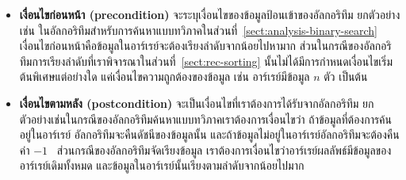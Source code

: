 \begin{itemize}
\item {\bf เงื่อนไข{\wbr}ก่อนหน้า (precondition)}
  จะ{\wbr}ระบุ{\wbr}เงื่อนไข{\wbr}ของ{\wbr}ข้อมูล{\wbr}ป้อน{\wbr}เข้า{\wbr}ของ{\wbr}อัล{\wbr}กอ{\wbr}ริ{\wbr}ทึม ยก{\wbr}ตัวอย่าง{\wbr}เช่น{\wbr}
  ใน{\wbr}อัล{\wbr}กอ{\wbr}ริ{\wbr}ทึม{\wbr}สำหรับ{\wbr}การ{\wbr}ค้นหา{\wbr}แบบ{\wbr}ทวิภาค{\wbr}ใน{\wbr}ส่วน{\wbr}ที่~\ref{sect:analysis-binary-search}
  เงื่อนไข{\wbr}ก่อนหน้า{\wbr}คือ{\wbr}ข้อมูล{\wbr}ใน{\wbr}อาร์เรย์{\wbr}จะ{\wbr}ต้อง{\wbr}เรียงลำดับ{\wbr}จาก{\wbr}น้อย{\wbr}ไป{\wbr}หา{\wbr}มาก{\wbr}
  ส่วน{\wbr}ใน{\wbr}กรณี{\wbr}ของ{\wbr}อัล{\wbr}กอ{\wbr}ริ{\wbr}ทึม{\wbr}การ{\wbr}เรียงลำดับ{\wbr}ที่{\wbr}เรา{\wbr}พิจารณา{\wbr}ใน{\wbr}ส่วน{\wbr}ที่~\ref{sect:rec-sorting}
  นั้น{\wbr}ไม่{\wbr}ได้{\wbr}มี{\wbr}การ{\wbr}กำหนด{\wbr}เงื่อนไข{\wbr}เริ่มต้น{\wbr}พิเศษ{\wbr}แต่อย่างใด แค่{\wbr}เงื่อนไข{\wbr}ความ{\wbr}ถูกต้อง{\wbr}ของ{\wbr}ข้อมูล เช่น{\wbr}
  อาร์เรย์มี{\wbr}ข้อมูล $n$ ตัว เป็นต้น{\wbr}
\item {\bf เงื่อนไข{\wbr}ตาม{\wbr}หลัง (postcondition)}
  จะ{\wbr}เป็น{\wbr}เงื่อนไข{\wbr}ที่{\wbr}เรา{\wbr}ต้องการ{\wbr}ได้{\wbr}รับ{\wbr}จาก{\wbr}อัล{\wbr}กอ{\wbr}ริ{\wbr}ทึม{\wbr}
  ยก{\wbr}ตัวอย่าง{\wbr}เช่น{\wbr}ใน{\wbr}กรณี{\wbr}ของ{\wbr}อัล{\wbr}กอ{\wbr}ริ{\wbr}ทึม{\wbr}ค้นหา{\wbr}แบบ{\wbr}ทวิภาค{\wbr}เรา{\wbr}ต้องการ{\wbr}เงื่อนไข{\wbr}ว่า{\wbr}
  ถ้า{\wbr}ข้อมูล{\wbr}ที่{\wbr}ต้องการ{\wbr}ค้น{\wbr}อยู่{\wbr}ใน{\wbr}อาร์เรย์ อัล{\wbr}กอ{\wbr}ริ{\wbr}ทึม{\wbr}จะ{\wbr}คืน{\wbr}ดัชนี{\wbr}ของ{\wbr}ข้อมูล{\wbr}นั้น{\wbr}
  และ{\wbr}ถ้า{\wbr}ข้อมูล{\wbr}ไม่{\wbr}อยู่{\wbr}ใน{\wbr}อาร์เรย์อัล{\wbr}กอ{\wbr}ริ{\wbr}ทึม{\wbr}จะ{\wbr}ต้อง{\wbr}คืน{\wbr}ค่า $-1$
  \ ส่วน{\wbr}กรณี{\wbr}ของ{\wbr}อัล{\wbr}กอ{\wbr}ริ{\wbr}ทึม{\wbr}จัดเรียง{\wbr}ข้อมูล{\wbr}
  เรา{\wbr}ต้องการ{\wbr}เงื่อนไข{\wbr}ว่า{\wbr}อาร์เรย์{\wbr}ผลลัพธ์{\wbr}มี{\wbr}ข้อมูล{\wbr}ของ{\wbr}อาร์เรย์{\wbr}เดิม{\wbr}ทั้งหมด{\wbr}
  และ{\wbr}ข้อมูล{\wbr}ใน{\wbr}อาร์เรย์{\wbr}นั้น{\wbr}เรียง{\wbr}ตาม{\wbr}ลำดับ{\wbr}จาก{\wbr}น้อย{\wbr}ไป{\wbr}มาก{\wbr}
\end{itemize}

